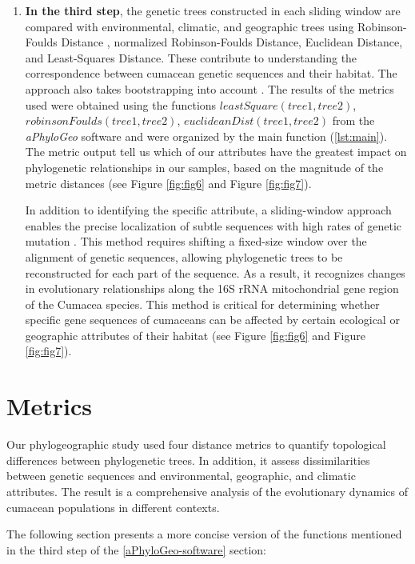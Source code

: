 \begin{enumerate}
\item \textbf{In the third step}, the genetic trees constructed in each sliding window are compared with environmental, climatic, and geographic trees using Robinson-Foulds Distance \citep{robinson_comparison_1981, koshkarov_phylogeography_2022}, normalized Robinson-Foulds Distance, Euclidean Distance, and Least-Squares Distance. These contribute to understanding the correspondence between cumacean genetic sequences and their habitat. The approach also takes bootstrapping into account \citep{koshkarov_phylogeography_2022}. The results of the metrics used were obtained using the functions $leastSquare(tree1, tree2)$, $robinsonFoulds(tree1, tree2)$, $euclideanDist(tree1, tree2)$ from the \textit{aPhyloGeo} software and were organized by the main function (\autoref{lst:main}). The metric output tell us which of our attributes have the greatest impact on phylogenetic relationships in our samples, based on the magnitude of the metric distances (see Figure \ref{fig:fig6} and Figure \ref{fig:fig7}). 

In addition to identifying the specific attribute, a sliding-window approach enables the precise localization of subtle sequences with high rates of genetic mutation \citep{koshkarov_phylogeography_2022}. This method requires shifting a fixed-size window over the alignment of genetic sequences, allowing phylogenetic trees to be reconstructed for each part of the sequence. As a result, it recognizes changes in evolutionary relationships along the 16S rRNA mitochondrial gene region of the Cumacea species. This method is critical for determining whether specific gene sequences of cumaceans can be affected by certain ecological or geographic attributes of their habitat (see Figure \ref{fig:fig6} and Figure \ref{fig:fig7}).
\end{enumerate}

\section{Metrics}\label{metrics}
Our phylogeographic study used four distance metrics to quantify topological differences between phylogenetic trees. In addition, it assess dissimilarities between genetic sequences and environmental, geographic, and climatic attributes. The result is a comprehensive analysis of the evolutionary dynamics of cumacean populations in different contexts. 

The following section presents a more concise version of the functions mentioned in the third step of the \autoref{aPhyloGeo-software} section:

